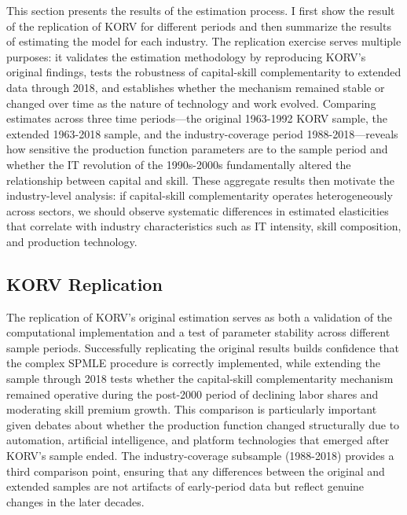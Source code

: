 \documentclass[12pt]{article}
\begin{document}
This section presents the results of the estimation process. I first show the result of the replication of KORV for different periods and then summarize the results of estimating the model for each industry. The replication exercise serves multiple purposes: it validates the estimation methodology by reproducing KORV's original findings, tests the robustness of capital-skill complementarity to extended data through 2018, and establishes whether the mechanism remained stable or changed over time as the nature of technology and work evolved. Comparing estimates across three time periods---the original 1963-1992 KORV sample, the extended 1963-2018 sample, and the industry-coverage period 1988-2018---reveals how sensitive the production function parameters are to the sample period and whether the IT revolution of the 1990s-2000s fundamentally altered the relationship between capital and skill. These aggregate results then motivate the industry-level analysis: if capital-skill complementarity operates heterogeneously across sectors, we should observe systematic differences in estimated elasticities that correlate with industry characteristics such as IT intensity, skill composition, and production technology.

\subsection{KORV Replication}\label{sec:results_original}

The replication of KORV's original estimation serves as both a validation of the computational implementation and a test of parameter stability across different sample periods. Successfully replicating the original results builds confidence that the complex SPMLE procedure is correctly implemented, while extending the sample through 2018 tests whether the capital-skill complementarity mechanism remained operative during the post-2000 period of declining labor shares and moderating skill premium growth. This comparison is particularly important given debates about whether the production function changed structurally due to automation, artificial intelligence, and platform technologies that emerged after KORV's sample ended. The industry-coverage subsample (1988-2018) provides a third comparison point, ensuring that any differences between the original and extended samples are not artifacts of early-period data but reflect genuine changes in the later decades.
\end{document}
